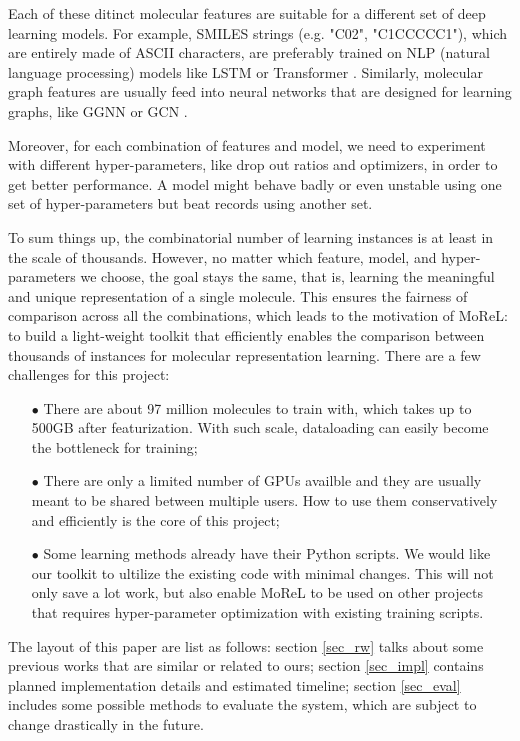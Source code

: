\documentclass[conference]{IEEEtran}
\begin{document}
Each of these ditinct molecular features are suitable for a different set of deep learning models. 
For example, SMILES strings (e.g. "C02", "C1CCCCC1"), which are entirely made of ASCII characters, are preferably trained on NLP (natural language processing) models like LSTM \cite{lstm} or Transformer \cite{transformer}. 
Similarly, molecular graph features are usually feed into neural networks that are designed for learning graphs, like GGNN \cite{ggnn} or GCN \cite{gcn}. 

Moreover, for each combination of features and model, we need to experiment with different hyper-parameters, like drop out ratios and optimizers, in order to get better performance. 
A model might behave badly or even unstable using one set of hyper-parameters but beat records using another set. 

To sum things up, the combinatorial number of learning instances is at least in the scale of thousands. 
However, no matter which feature, model, and hyper-parameters we choose, the goal stays the same, that is, learning the meaningful and unique representation of a single molecule. 
This ensures the fairness of comparison across all the combinations, which leads to the motivation of MoReL: to build a light-weight toolkit that efficiently enables the comparison between thousands of instances for molecular representation learning. 
There are a few challenges for this project:
\begin{itemize}
	\item[$\bullet$]  There are about 97 million molecules to train with, which takes up to 500GB after featurization. With such scale, dataloading can easily become the bottleneck for training; 
	\item[$\bullet$]  There are only a limited number of GPUs availble and they are usually meant to be shared between multiple users. How to use them conservatively and efficiently is the core of this project; 
	\item[$\bullet$]  Some learning methods already have their Python scripts. We would like our toolkit to ultilize the existing code with minimal changes. This will not only save a lot work, but also enable MoReL to be used on other projects that requires hyper-parameter optimization with existing training scripts. 
\end{itemize}

The layout of this paper are list as follows: 
section \ref{sec_rw} talks about some previous works that are similar or related to ours; 
section \ref{sec_impl} contains planned implementation details and estimated timeline; 
section \ref{sec_eval} includes some possible methods to evaluate the system, which are subject to change drastically in the future. 
\end{document}
